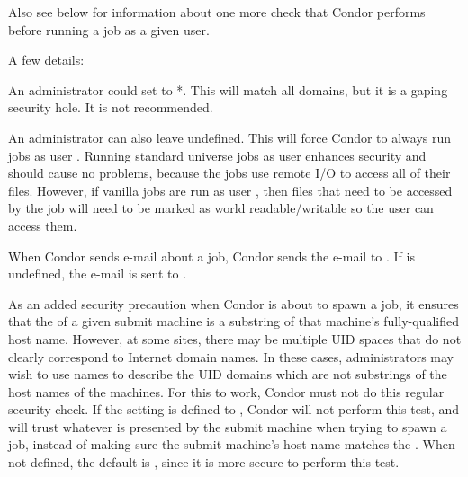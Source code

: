 \begin{description}
  Also see 
  below for information about one more check
  that Condor performs before running a job as a given user.

  A few details:

  An administrator could set 
  to *. This will match all domains,
  but it is a gaping security hole. It is not recommended.

  An administrator can also leave  undefined.
  This will force Condor to always run jobs as user .
  Running standard universe jobs as user  enhances
  security and should cause no problems, because the jobs use remote
  I/O to access all of their files.
  However, if vanilla jobs are run as
  user , then files that need to be accessed by the job will need
  to be marked as world readable/writable so the user  can access
  them.

  When Condor sends e-mail about a job, Condor sends the e-mail to
  .
  If 
  is undefined, the e-mail is sent to .


\item[\Macro{TRUST\_UID\_DOMAIN}]
  \label{param:TrustUidDomain}
  As an added security precaution when Condor is about to spawn a job,
  it ensures that the  of a given
  submit machine is a substring of that machine's fully-qualified
  host name.
  However, at some sites, there may be multiple UID spaces that do
  not clearly correspond to Internet domain names.
  In these cases, administrators may wish to use names to describe the
  UID domains which are not substrings of the host names of the
  machines.
  For this to work, Condor must not do this regular security check.
  If the  setting is defined to ,
  Condor will not perform this test, and will trust whatever
   is presented by the submit machine when trying
  to spawn a job, instead of making sure the submit machine's host name
  matches the .
  When not defined, the default is ,
  since it is more secure to perform this test. 


\end{description}
